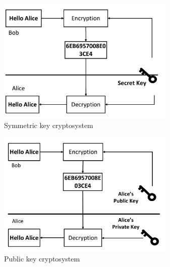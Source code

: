 \begin{figure}[h!]
    \centering
    \includegraphics[width=.7\textwidth , height = 6cm]{images/SymmetricKeyEncryption}
    \caption{Symmetric key cryptosystem}
    \label{fig:symmetric_key_encryption}
\end{figure}
\begin{figure}[h!]
    \centering
    \includegraphics[width=.7\textwidth , height = 6cm]{images/PublicKeyEncryption}
    \caption{Public key cryptosystem}
    \label{fig:public_key_encryption}
\end{figure}
